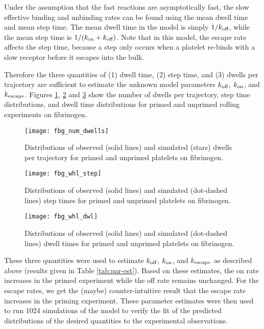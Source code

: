 \documentclass{article}
\newcommand{\tn}{\textnormal}
\begin{document}
Under the assumption that the fast reactions are asymptotically fast,
the slow effective binding and unbinding rates can be found using the
mean dwell time and mean step time. The mean dwell time in the model
is simply $1 / k_\tn{off}$, while the mean step time is
$1 / (k_\tn{on} + k_\tn{off})$. Note that in this model, the escape
rate affects the step time, because a step only occurs when a platelet
re-binds with a slow receptor before it escapes into the bulk.

Therefore the three quantities of (1) dwell time, (2) step time, and
(3) dwells per trajcetory are sufficient to estimate the unknown model
parameters $k_\tn{off}$, $k_\tn{on}$, and $k_\tn{escape}$. Figures
\ref{fig:ndwells}, \ref{fig:step-time} and \ref{fig:pause-time} show
the number of dwells per trajectory, step time distributions, and
dwell time distributions for primed and unprimed rolling experiments
on fibrinogen.

\begin{figure}
  \centering
  \texttt{[image: fbg\_num\_dwells]}
  \caption{Distributions of observed (solid lines) and simulated
    (stars) dwells per trajectory for primed and unprimed platelets on
    fibrinogen.}
  \label{fig:ndwells}
\end{figure}

\begin{figure}
  \centering
  \texttt{[image: fbg\_whl\_step]}
  \caption{Distributions of observed (solid lines) and simulated
    (dot-dashed lines) step times for primed and unprimed platelets
    on fibrinogen.}
  \label{fig:step-time}
\end{figure}

\begin{figure}
  \centering
  \texttt{[image: fbg\_whl\_dwl]}
  \caption{Distributions of observed (solid lines) and simulated
    (dot-dashed lines) dwell times for primed and unprimed platelets
    on fibrinogen.}
  \label{fig:pause-time}
\end{figure}

These three quantities were used to estimate $k_\tn{off}$,
$k_\tn{on}$, and $k_\tn{escape}$ as described above (results given in
Table \ref{tab:par-est}). Based on these estimates, the on rate
increases in the primed experiment while the off rate remains
unchanged. For the escape rates, we get the (maybe) counter-intuitive
result that the escape rate increases in the priming experiment. These
parameter estimates were then used to run 1024 simulations of the model to
verify the fit of the predicted distributions of the desired
quantities to the experimental observations.
\end{document}
